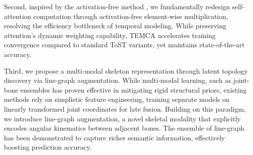 Second, inspired by the activation-free method \cite{rewrite_stars}, we fundamentally redesign self-attention computation through activation-free element-wise multiplication, resolving the efficiency bottleneck of temporal modeling. 
While preserving attention's dynamic weighting capability, TEMCA 
accelerates training convergence compared to standard 
ToST variants, yet maintains state-of-the-art accuracy. 


Third, we propose a multi-modal skeleton representation through latent 
topology discovery via line-graph augmentation. While multi-modal 
learning, such as joint-bone ensembles \cite{ref9,ref10,ref11,ref13} has proven 
effective in mitigating rigid structural priors, existing methods rely 
on simplistic feature engineering, training separate models on linearly 
transformed joint coordinates for late fusion. 
Building on this paradigm, we introduce line-graph augmentation, a 
novel skeletal modality that explicitly encodes angular kinematics 
between adjacent bones. The ensemble of line-graph has been demonstrated 
to capture richer semantic information, effectively boosting prediction 
accuracy.


